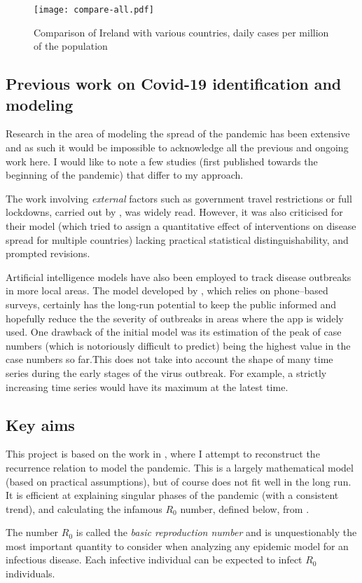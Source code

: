\begin{figure}[H]
\texttt{[image: compare-all.pdf]}
\endminipage
\caption{Comparison of Ireland with various countries, daily cases per million of the population}
\end{figure}




\subsection{Previous work on Covid-19 identification and modeling}
Research in the area of modeling the spread of the pandemic has been extensive and as such it would be impossible to acknowledge all the previous and ongoing work here. I would like to note a few studies (first published towards the beginning of the pandemic) that differ to my approach.

The work involving \textit{external} factors such as government travel restrictions or full lockdowns, carried out by \cite{flaxman20}, was widely read. However, it was also criticised for their model (which tried to assign a quantitative effect of interventions on disease spread for multiple countries) lacking practical statistical distinguishability, and prompted revisions.

Artificial intelligence models have also been employed to track disease outbreaks in more local areas. The model developed by \cite{SrinivasaRao2020}, which relies on phone–based surveys, certainly has the long-run potential to keep the public informed and hopefully reduce the the severity of outbreaks in areas where the app is widely used. One drawback of the initial model was its estimation of the peak of case numbers (which is notoriously difficult to predict) being the highest value in the case numbers so far.This does not take into account the shape of many time series during the early stages of the virus outbreak. For example, a strictly increasing time series would have its maximum at the latest time.


\subsection{Key aims}

This project is based on the work in \cite{grigor20}, where I attempt to reconstruct the recurrence relation to model the pandemic. This is a largely mathematical model (based on practical assumptions), but of course does not fit well in the long run. It is efficient at explaining singular phases of the pandemic (with a consistent trend), and calculating the infamous $R_0$ number, defined below, from \cite{epid08}. 

\begin{ndefinition} 
The number $R_0$ is called
the \textit{basic reproduction number} and is unquestionably the most important quantity to consider when analyzing any epidemic model for an infectious disease. Each infective individual can be expected to infect $R_0$ individuals. 
\end{ndefinition}